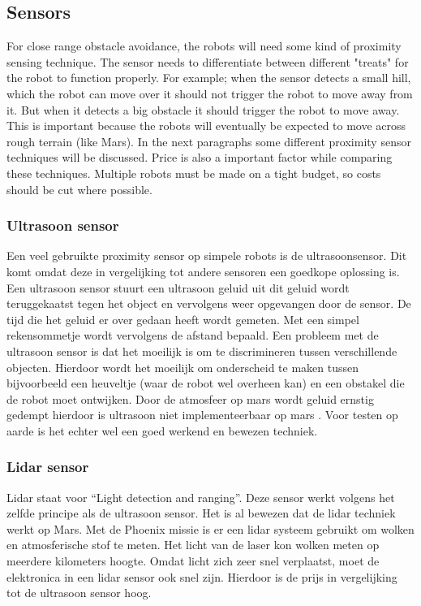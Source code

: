 \documentclass[10pt,a4paper]{article}
\begin{document}
\newpage



\subsection{Sensors}
For close range obstacle avoidance, the robots will need some kind of proximity sensing technique. The sensor needs to differentiate between different "treats" for the robot to function properly. For example; when the sensor detects a small hill, which the robot can move over it should not trigger the robot to move away from it. But when it detects a big obstacle it should trigger the robot to move away. This is important because the robots will eventually be expected to move across rough terrain (like Mars). In the next paragraphs some different proximity sensor techniques will be discussed. Price is also a important factor while comparing these techniques. Multiple robots must be made on a tight budget, so costs should be cut where possible.\\


\subsubsection{Ultrasoon sensor}
Een veel gebruikte proximity sensor op simpele robots is de ultrasoonsensor. Dit komt omdat deze in vergelijking tot andere sensoren een goedkope oplossing is. Een ultrasoon sensor stuurt een ultrasoon geluid uit dit geluid wordt teruggekaatst tegen het object en vervolgens weer opgevangen door de sensor. De tijd die het geluid er over gedaan heeft wordt gemeten. Met een simpel rekensommetje wordt vervolgens de afstand bepaald. Een probleem met de ultrasoon sensor is dat het moeilijk is om te discrimineren tussen verschillende objecten. Hierdoor wordt het moeilijk om onderscheid te maken tussen bijvoorbeeld een heuveltje (waar de robot wel overheen kan) en een obstakel die de robot moet ontwijken. Door de atmosfeer op mars wordt geluid ernstig gedempt hierdoor is ultrasoon niet implementeerbaar op mars \cite{soundonmars}. Voor testen op aarde is het echter wel een goed werkend en bewezen techniek.

\subsubsection{Lidar sensor}
Lidar staat voor “Light detection and ranging”. Deze sensor werkt volgens het zelfde principe als de ultrasoon sensor. Het is al bewezen dat de lidar techniek werkt op Mars. Met de Phoenix missie is er een lidar systeem gebruikt om wolken en atmosferische stof te meten\cite{lidarmars}. Het licht van de laser kon wolken meten op meerdere kilometers hoogte. Omdat licht zich zeer snel verplaatst, moet de elektronica in een lidar sensor ook snel zijn. Hierdoor is de prijs in vergelijking tot de ultrasoon sensor hoog.
\end{document}
